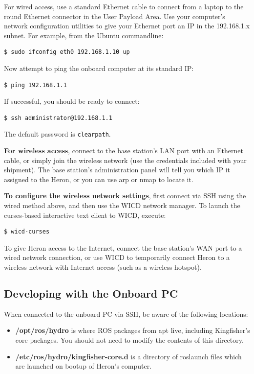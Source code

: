 \documentclass[]{clearpath-latex/clearpath-manual}
\begin{document}
For wired access, use a standard Ethernet cable to connect from a laptop to the round Ethernet connector in the User Payload Area. Use your computer’s network configuration utilities to give your Ethernet port an IP in the 192.168.1.x subnet. For example, from the Ubuntu commandline:

\begin{lstlisting}
$ sudo ifconfig eth0 192.168.1.10 up
\end{lstlisting}

Now attempt to ping the onboard computer at its standard IP:

\begin{lstlisting}
$ ping 192.168.1.1
\end{lstlisting}

If successful, you should be ready to connect:

\begin{lstlisting}
$ ssh administrator@192.168.1.1
\end{lstlisting}

The default password is \lstinline{clearpath}.


\textbf{For wireless access}, connect to the base station’s LAN port with an Ethernet cable, or simply join the wireless network (use the credentials included with your shipment). The base station’s administration panel will tell you which IP it assigned to the Heron, or you can use arp or nmap to locate it.

\textbf{To configure the wireless network settings}, first connect via SSH using the wired method above, and then use the WICD network manager. To launch the curses-based interactive text client to WICD, execute:

\begin{lstlisting}
$ wicd-curses
\end{lstlisting}

To give Heron access to the Internet, connect the base station’s WAN port to a wired network connection, or use WICD to temporarily connect Heron to a wireless network with Internet access (such as a wireless hotspot).

\subsection{Developing with the Onboard PC}
When connected to the onboard PC via SSH, be aware of the following locations:

\begin{itemize}[nolistsep]
	\item \textbf{/opt/ros/hydro} is where ROS packages from apt live, including Kingfisher’s core packages. You should not need to modify the contents of this directory.
	\item \textbf{/etc/ros/hydro/kingfisher-core.d} is a directory of roslaunch files which are launched on bootup of Heron's computer.
\end{itemize}
\end{document}
